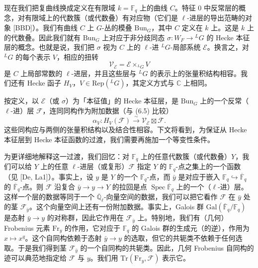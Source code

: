 \documentclass[11pt,a4paper]{article}
\newcommand{\Bun}{\mathrm{Bun}}
\begin{document}

现在我们把复曲线换成定义在有限域 $k = \mathbb{F}_q$ 上的曲线 $C$。特征 $0$ 中反常层的概念，对有限域上的代数簇（或代数叠）有对应物（它们是 $\ell$-进层的导出范畴的对象 [BBD]）。我们有曲线 $C$ 上 $G$-丛的模叠 $\Bun_G$，其中 $C$ 定义在 $k$ 上。这是 $k$ 上的代数叠。因此我们就有 $\Bun_G$ 上对应于非分歧同态 $\sigma : W_F \to {}^{L}G$ 的 Hecke 本征层的概念。也就是说，我们把 $\sigma$ 视为 $C$ 上的 $\ell$-进 ${}^{L}G$-局部系统 $\mathcal{E}$。换言之，对 ${}^{L}G$ 的每个表示 $V$，相应的扭转
\[
\mathcal{V}_{\mathcal{E}} = \mathcal{E} \times_{{}^{L}G} V
\]
是 $C$ 上局部常数的 $\ell$-进层，并且这些层与 ${}^{L}G$ 的表示上的张量积结构相容。我们还有 Hecke 函子 $H_V$，$V\in \mathrm{Rep}({}^{L}G)$，其定义方式与 $\mathbb{C}$ 上相同。

按定义，以 $\mathcal{E}$（或 $\sigma$）为「本征值」的 Hecke 本征层，是 $\Bun_G$ 上的一个反常（$\ell$-进）层 $\mathcal{F}$，连同同构作为附加数据（与 (6.5) 比较）
\begin{equation}\tag{8.1}
\alpha_V : H_V(\mathcal{F}) \xrightarrow{\ \sim\ } \mathcal{V}_{\mathcal{E}} \boxtimes \mathcal{F}.
\end{equation}
这些同构应与两侧的张量积结构以及结合性相容。下文将看到，为保证从 Hecke 本征层到 Hecke 本征函数的过渡，我们需要再施加一个等变性条件。

为更详细地解释这一过渡，我们回忆：对 $\mathbb{F}_q$ 上的任意代数簇（或代数叠）$Y$，我们可以给 $Y$ 上的任意 $\ell$-进层（或复形）$\mathcal{F}$ 指定 $Y$ 的 $\mathbb{F}_q$-点之集上的一个函数（见 [De, La1]）。事实上，设 $y$ 是 $Y$ 的一个
$\mathbb{F}_q$-点，而 $\bar y$ 是对应于嵌入 $\mathbb{F}_q \hookrightarrow \overline{\mathbb{F}}_q$ 的 $\overline{\mathbb{F}}_q$-点。则 $\mathcal{F}$ 沿复合 $\bar y \to y \to Y$ 的拉回是点 $\operatorname{Spec}\overline{\mathbb{F}}_q$ 上的一个（$\ell$-进）层。这样一个层的数据等同于一个 $\overline{\mathbb{Q}}_\ell$-向量空间的数据，我们可以把它看作 $\mathcal{F}$ 在 $\bar y$ 处的茎 $\mathcal{F}_{\bar y}$。这个向量空间上还有一份附加数据。事实上，Galois 群 $\mathrm{Gal}(\overline{\mathbb{F}}_q/\mathbb{F}_q)$ 是态射 $\bar y \to y$ 的对称群，因此它作用在 $\mathcal{F}_{\bar y}$ 上。特别地，我们有（几何）Frobenius 元素 $\mathrm{Fr}_y$ 的作用，它对应于 $\mathbb{F}_q$ 的 Galois 群的生成元（的逆），作用为 $x \mapsto x^q$。这个自同构依赖于态射 $\bar y \to y$ 的选取，但它的共轭类不依赖于任何选取。于是我们得到茎 $\mathcal{F}_{\bar y}$ 的一个自同构的共轭类。因此，几何 Frobenius 自同构的迹可以典范地指定给 $\mathcal{F}$ 与 $y$。我们用 $\mathrm{Tr}(\mathrm{Fr}_y, \mathcal{F})$ 表示它。
\end{document}
